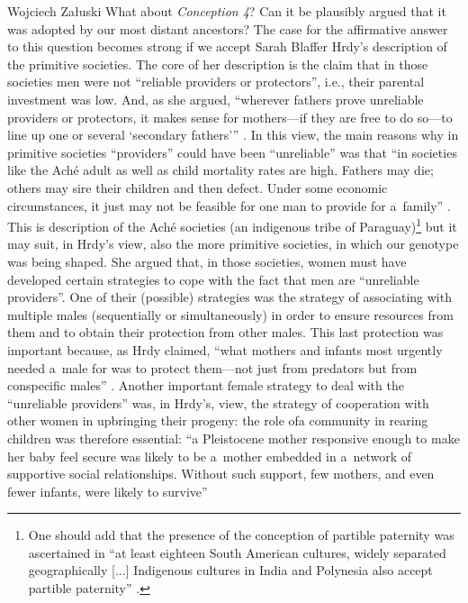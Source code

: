 \begin{artengenv}{Wojciech Załuski}
What about \textit{Conception 4}? Can it be plausibly argued that it was adopted by our most distant ancestors? The case for the affirmative answer to this question becomes strong if we accept Sarah Blaffer Hrdy's description of the primitive societies. The core of her description is the claim that in those societies men were not ``reliable providers or protectors'', i.e., their parental investment was low. And, as she argued, ``wherever fathers prove unreliable providers or protectors, it makes sense for mothers---if they are free to do so---to line up one or several ‘secondary fathers'{''}
\parencite[][p.xxiii]{hrdy_woman_1999}. %
 In this view, the main reasons why in primitive societies ``providers'' could have been ``unreliable'' was that ``in societies like the Aché adult as well as child mortality rates are high. Fathers may die; others may sire their children and then defect. Under some economic circumstances, it just may not be feasible for one man to provide for a~family'' 
\parencite[][p.xxiii]{hrdy_woman_1999}. %
 This is description of the Aché societies (an indigenous tribe of Paraguay)\footnote{One should add that the presence of the conception of partible paternity was ascertained in ``at least eighteen South American cultures, widely separated geographically [...] Indigenous cultures in India and Polynesia also accept partible paternity'' 
\parencite[][p.70]{hubin_daddy_2003}.%
} but it may suit, in Hrdy's view, also the more primitive societies, in which our genotype was being shaped. She argued that, in those societies, women must have developed certain strategies to cope with the fact that men are ``unreliable providers''. One of their (possible) strategies was the strategy of associating with multiple males (sequentially or simultaneously) in order to ensure resources from them and to obtain their protection from other males. This last protection was important because, as Hrdy claimed, ``what mothers and infants most urgently needed a~male for was to protect them---not just from predators but from conspecific males'' 
\parencite[][p.148]{hrdy_mothers_2009}. %
 Another important female strategy to deal with the ``unreliable providers'' was, in Hrdy's, view, the strategy of cooperation with other women in upbringing their progeny: the role ofa community in rearing children was therefore essential: ``a Pleistocene mother responsive enough to make her baby feel secure was likely to be a~mother embedded in a~network of supportive social relationships. Without such support, few mothers, and even fewer infants, were likely to survive'' 

\end{artengenv}
